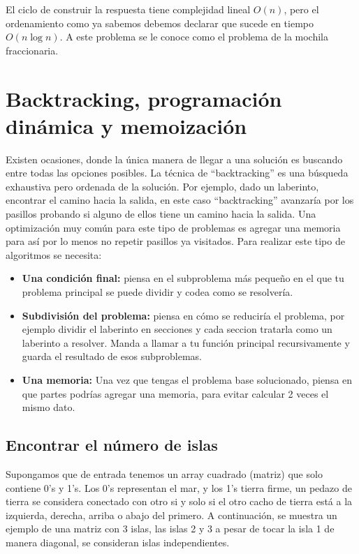 El ciclo de construir la respuesta tiene complejidad lineal $O(n)$, pero el ordenamiento como ya sabemos debemos declarar que sucede en tiempo $O(n \log n)$. A este problema se le conoce como el problema de la mochila fraccionaria.


\section{Backtracking, programación dinámica y memoización}

Existen ocasiones, donde la única manera de llegar a una solución es buscando entre todas las opciones posibles. La técnica de ``backtracking'' es una búsqueda exhaustiva pero ordenada de la solución. Por ejemplo, dado un laberinto, encontrar el camino hacia la salida, en este caso ``backtracking'' avanzaría por los pasillos probando si alguno de ellos tiene un camino hacia la salida. Una optimización muy común para este tipo de problemas es agregar una memoria para así por lo menos no repetir pasillos ya visitados.
Para realizar este tipo de algoritmos se necesita:

\begin{itemize}
    \item \textbf{Una condición final:} piensa en el subproblema más pequeño en el que tu problema principal se puede dividir y codea como se resolvería.
    \item \textbf{Subdivisión del problema:} piensa en cómo se reduciría el problema, por ejemplo dividir el laberinto en secciones y cada seccion tratarla como un laberinto a resolver. Manda a llamar a tu función principal recursivamente y guarda el resultado de esos subproblemas.
    \item \textbf{Una memoria:} Una vez que tengas el problema base solucionado, piensa en que partes podrías agregar una memoria, para evitar calcular 2 veces el mismo dato.
\end{itemize}


\subsection{Encontrar el número de islas}

Supongamos que de entrada tenemos un array cuadrado (matriz) que solo contiene 0's y 1's. Los 0's representan el mar, y los 1's tierra firme, un pedazo de tierra se considera conectado con otro si y solo si el otro cacho de tierra está a la izquierda, derecha, arriba o abajo del primero. A continuación, se muestra un ejemplo de una matriz con 3 islas, las islas 2 y 3 a pesar de tocar la isla 1 de manera diagonal, se consideran islas independientes.

